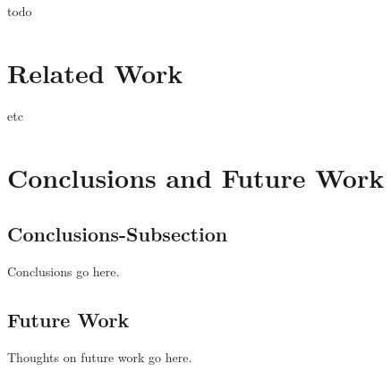 \documentclass[10pt]{article}
\begin{document}
todo


\section{Related Work}
\label{sec:Related}
etc

\section{Conclusions and Future Work}

\subsection{Conclusions-Subsection}
\label{sec:Conclusions-Subsection}

Conclusions go here. 

\subsection{Future Work}
\label{sec:Future Work}
Thoughts on future work go here.



\end{document}
